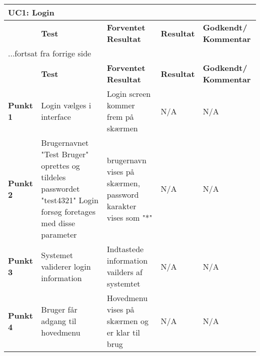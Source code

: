 
\begin{center}
\begin{longtable}{|p{}|p{}|p{3cm}|p{3cm}|p{3cm}|} %
\hline
\multicolumn{5}{|l|}{\textbf{UC1: Login}} \\ \hline
\multicolumn{1}{|c|}{} &
\textbf{Test} &
\textbf{Forventet \newline Resultat} &
\textbf{Resultat} &
\textbf{Godkendt/ \newline Kommentar} \\ \hline 
\endfirsthead

\multicolumn{5}{l}{...fortsat fra forrige side} \\ \hline 
\multicolumn{1}{|c|}{} &
\textbf{Test} &
\textbf{Forventet \newline Resultat} &
\textbf{Resultat} &
\textbf{Godkendt/ \newline Kommentar} \\ \hline 
\endhead


\textbf{Punkt 1}		
&Login vælges i interface	
&Login screen kommer frem på skærmen 	
&N/A 	
&N/A \\\hline
\textbf{Punkt 2}		
&Brugernavnet "Test Bruger" oprettes og tildeles passwordet "test4321" Login forsøg foretages med disse parameter	
&brugernavn vises på skærmen, password karakter vises som "*" 	
&N/A 	
&N/A \\\hline
\textbf{Punkt 3}		
&Systemet validerer login information		
&Indtastede information vailders af systemtet 	
&N/A 	
&N/A \\\hline
\textbf{Punkt 4}		
&Bruger får adgang til hovedmenu		
&Hovedmenu vises på skærmen og er klar til brug 	
&N/A 	
&N/A  \\\hline
	\end{longtable}
	\label{ATUC1} 
\end{center}